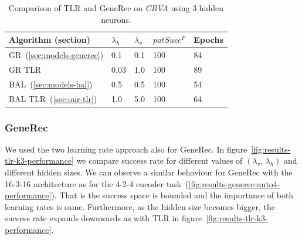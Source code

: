 \begin{table}[H] 
  \centering
    \begin{tabular}{|l|l|l|l|l|}
    \hline
    Algorithm (section)&$\lambda_h$&$\lambda_v$&$patSucc^F$ &Epochs\\ %
    \hline
    GR~(\ref{sec:models-generec}) & 0.1 & 0.1 & 100 & 84\\ %
    \hline
    GR TLR &0.03 & 1.0 & 100 & 89\\ %
    \hline
    BAL~(\ref{sec:models-bal})&0.5& 0.5&100& 54\\ %
    \hline
    BAL TLR~(\ref{sec:our-tlr})&1.0& 5.0 & 100& 64\\ %
    \hline 
    \end{tabular}
  \caption{Comparison of TLR and GeneRec on \emph{CBVA} using 3 hidden neurons.} 
  \label{tab:results-cmp-k3}
\end{table}






\subsubsection{GeneRec} 

We used the two learning rate approach also for GeneRec. In figure~\ref{fig:results-tlr-k3-performance} we compare success rate for different values of $(\lambda_v,\, \lambda_h)$ and different hidden sizes. We can observe a similar behaviour for GeneRec with the 16-3-16 architecture as for the 4-2-4 encoder task~(\ref{fig:results-generec-auto4-performance}). That is the success space is bounded and the importance of both learning rates is same. Furthermore, as the hidden size becomes bigger, the success rate expands downwards as with TLR in figure~\ref{fig:results-tlr-k3-performance}. 


